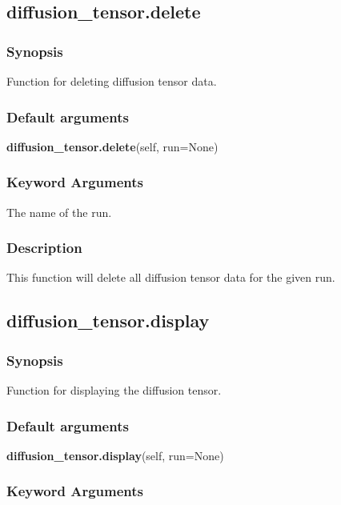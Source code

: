 \subsection{diffusion\_tensor.delete}


\subsubsection{Synopsis}

Function for deleting diffusion tensor data.

\subsubsection{Default arguments}

\textsf{\textbf{diffusion\_tensor.delete}(self, run=None)}


\subsubsection{Keyword Arguments}

  The name of the run.

\subsubsection{Description}

This function will delete all diffusion tensor data for the given run.


\newpage

\subsection{diffusion\_tensor.display}


\subsubsection{Synopsis}

Function for displaying the diffusion tensor.

\subsubsection{Default arguments}

\textsf{\textbf{diffusion\_tensor.display}(self, run=None)}


\subsubsection{Keyword Arguments}

